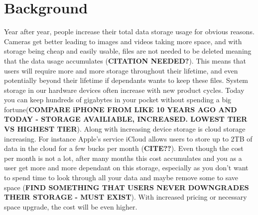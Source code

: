 \section{Background}
\label{sec:background}


Year after year, people increase their total data storage usage for obvious reasons. Cameras get better leading to images and videos taking more space, and with storage being cheap and easily usable, files are not needed to be deleted meaning that the data usage accumulates (\textbf{CITATION NEEDED?}). This means that users will require more and more storage throughout their lifetime, and even potentially beyond their lifetime if dependants wants to keep these files. System storage in our hardware devices often increase with new product cycles. Today you can keep hundreds of gigabytes in your pocket without spending a big fortune(\textbf{COMPARE iPHONE FROM LIKE 10 YEARS AGO AND TODAY - STORAGE AVAILIABLE, INCREASED. LOWEST TIER VS HIGHEST TIER}). Along with increasing device storage is cloud storage increasing. For instance Apple's service iCloud allows users to store up to 2TB of data in the cloud for a few bucks per month (\textbf{CITE??}). Even though the cost per month is not a lot, after many months this cost accumulates and you as a user get more and more dependant on this storage, especially as you don't want to spend time to look through all your data and maybe remove some to save space (\textbf{FIND SOMETHING THAT USERS NEVER DOWNGRADES THEIR STORAGE - MUST EXIST}). With increased pricing or necessary space upgrade, the cost will be even higher.

